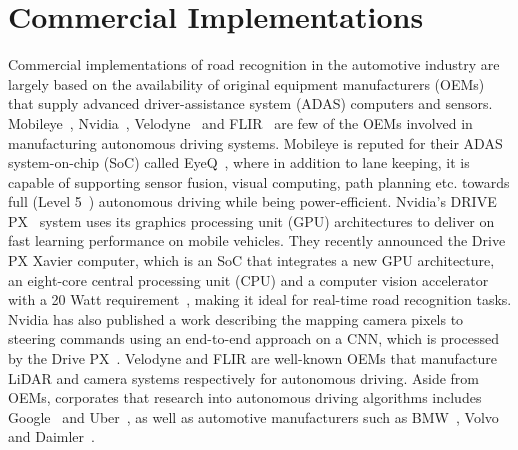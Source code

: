 \section{Commercial Implementations} \label{seccommercial}
Commercial implementations of road recognition in the automotive industry are largely based on the availability of original equipment manufacturers (OEMs) that supply advanced driver-assistance system (ADAS) computers and sensors. Mobileye~\cite{mobileye_mobileye_2016}, Nvidia~\cite{nvidia_corporation_nvidia_2017-1}, Velodyne~\cite{velodyne_lidar_velodyne_2017-1} and FLIR~\cite{flir_systems_flir_2017-1} are few of the OEMs involved in manufacturing autonomous driving systems. Mobileye is reputed for their ADAS system-on-chip (SoC) called EyeQ~\cite{mobileye_evolution_2017}, where in addition to lane keeping, it is capable of supporting sensor fusion, visual computing, path planning etc. towards full (Level 5~\cite{sae_international_u.s._2016-1}) autonomous driving while being power-efficient. Nvidia's DRIVE PX~\cite{nvidia_corporation_nvidia_2017-1} system uses its graphics processing unit (GPU) architectures to deliver on fast learning performance on mobile vehicles. They recently announced the Drive PX Xavier computer, which is an SoC that integrates a new GPU architecture, an eight-core central processing unit (CPU) and a computer vision accelerator with a 20 Watt requirement~\cite{shapiro_introducing_2016}, making it ideal for real-time road recognition tasks. Nvidia has also published a work describing the mapping camera pixels to steering commands using an end-to-end approach on a CNN, which is processed by the Drive PX~\cite{bojarski_end_2016}. Velodyne and FLIR are well-known OEMs that manufacture LiDAR and camera systems respectively for autonomous driving. Aside from OEMs, corporates that research into autonomous driving algorithms includes Google~\cite{waymo_waymo_2017} and Uber~\cite{etherington_ubers_2016}, as well as automotive manufacturers such as BMW~\cite{nica_bmw_2016}, Volvo~\cite{volvo_car_corporation_autonomous_2017-1} and Daimler~\cite{daimler_ag._autonomous_2017}.


